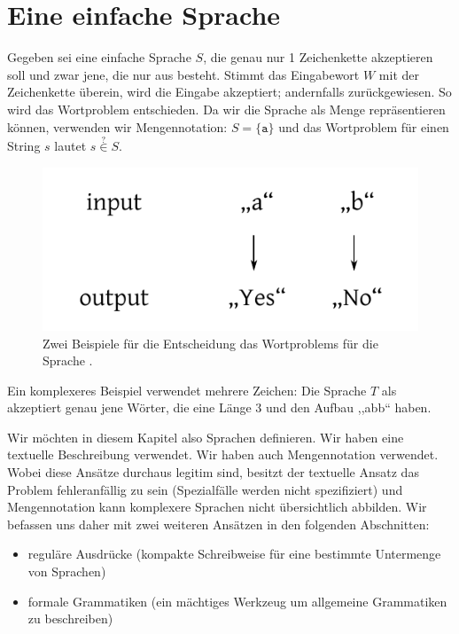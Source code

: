 \section{Eine einfache Sprache}
%
Gegeben sei eine einfache Sprache $S$, die genau nur 1 Zeichenkette akzeptieren soll und zwar jene, die nur aus  besteht. Stimmt das Eingabewort $W$ mit der Zeichenkette  überein, wird die Eingabe akzeptiert; andernfalls zurückgewiesen. So wird das Wortproblem entschieden. Da wir die Sprache als Menge repräsentieren können, verwenden wir Mengennotation: $S = \{\texttt{a}\}$ und das Wortproblem für einen String $s$ lautet $s \stackrel{?}{\in} S$.
%
\begin{figure}[ht]
 \begin{center}
  \includegraphics{img/wordproblem.pdf}
  \caption{Zwei Beispiele für die Entscheidung das Wortproblems für die Sprache .}
  \label{fig:wordproblem}
 \end{center}
\end{figure}

Ein komplexeres Beispiel verwendet mehrere Zeichen: Die Sprache $T$ als  akzeptiert genau jene Wörter, die eine Länge 3 und den Aufbau ,,abb`` haben.

Wir möchten in diesem Kapitel also Sprachen definieren. Wir haben eine textuelle Beschreibung verwendet. Wir haben auch Mengennotation verwendet. Wobei diese Ansätze durchaus legitim sind, besitzt der textuelle Ansatz das Problem fehleranfällig zu sein (Spezialfälle werden nicht spezifiziert) und Mengennotation kann komplexere Sprachen nicht übersichtlich abbilden. Wir befassen uns daher mit zwei weiteren Ansätzen in den folgenden Abschnitten:
\begin{itemize}
  \item reguläre Ausdrücke (kompakte Schreibweise für eine bestimmte Untermenge von Sprachen)
  \item formale Grammatiken (ein mächtiges Werkzeug um allgemeine Grammatiken zu beschreiben)
\end{itemize}

